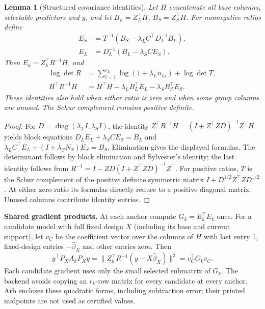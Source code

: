 \documentclass[preprint,11pt,numbers]{elsarticle}
\newtheorem{lemma}[theorem]{Lemma}
\theoremstyle{remark}\newtheorem{remark}[theorem]{Remark}
\newcommand{\diag}{\operatorname{diag}}
\begin{document}
\begin{lemma}[Structured covariance identities]\label{lem:schur}
Let $H$ concatenate all base columns, selectable predictors and $y$, and let
$B_L=Z_L^\top H$, $B_S=Z_S^\top H$. For nonnegative ratios define
\begin{align}
E_S&=T^{-1}(B_S-\lambda_LC^\top D_L^{-1}B_L),\\
E_L&=D_L^{-1}(B_L-\lambda_SC E_S).
\end{align}
Then $E_k=Z_k^\top R^{-1}H$, and
\begin{align}
\log\det R&=\sum_{i=1}^{r_L}\log(1+\lambda_L n_{Li})+\log\det T,\label{eq:schurdet}\\
H^\top R^{-1}H&=H^\top H-\lambda_L B_L^\top E_L-\lambda_S B_S^\top E_S.
\end{align}
These identities also hold when either ratio is zero and when some group columns
are unused. The Schur complement remains positive definite.
\end{lemma}
\begin{proof}
For $D=\diag(\lambda_LI,\lambda_SI)$, the identity
$Z^\top R^{-1}H=(I+Z^\top ZD)^{-1}Z^\top H$ yields block equations
$D_LE_L+\lambda_SC E_S=B_L$ and
$\lambda_LC^\top E_L+(I+\lambda_SN_S)E_S=B_S$.
Elimination gives the displayed formulas. The determinant follows by block
elimination and Sylvester's identity; the last identity follows from
$R^{-1}=I-ZD(I+Z^\top ZD)^{-1}Z^\top$. For positive ratios, $T$ is the Schur
complement of the positive definite symmetric matrix
$I+D^{1/2}Z^\top ZD^{1/2}$. At either zero ratio its formulas directly reduce
to a positive diagonal matrix. Unused columns contribute identity entries.
\end{proof}

\textbf{Shared gradient products.}
At each anchor compute $G_k=E_k^\top E_k$ once. For a candidate model with full
fixed design $X$ (including its base and current support), let
$v_C$ be the coefficient vector over the columns of $H$ with last entry 1,
fixed-design entries $-\widehat\beta_X$ and other entries zero. Then
\begin{equation}\label{eq:sharedgradient}
y^\top P_X A_k P_X y=\|Z_k^\top R^{-1}(y-X\widehat\beta_X)\|^2
                      =v_C^\top G_k v_C.
\end{equation}
Each candidate gradient uses only the small selected submatrix of $G_k$.
The backend avoids copying an $r_k$-row matrix for every candidate at every
anchor. Arb encloses these quadratic forms, including subtraction error; their
printed midpoints are not used as certified values.
\end{document}
